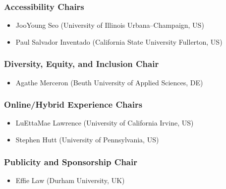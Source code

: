 \documentclass[letterpaper,11pt,oneside]{book} %
\providecommand{\tightlist}{%
  \setlength{\itemsep}{0pt}\setlength{\parskip}{0pt}}
\begin{document}
\subsubsection{Accessibility Chairs}%

\begin{itemize}
\tightlist
\item
  JooYoung Seo (University of Illinois Urbana--Champaign, US)
\item
  Paul Salvador Inventado (California State University Fullerton, US)
\end{itemize}

\subsubsection{Diversity, Equity, and Inclusion
Chair}%

\begin{itemize}
\tightlist
\item
  Agathe Merceron (Beuth University of Applied Sciences, DE)
\end{itemize}

\subsubsection{Online/Hybrid Experience
Chairs}%

\begin{itemize}
\tightlist
\item
  LuEttaMae Lawrence (University of California Irvine, US)
\item
  Stephen Hutt (University of Pennsylvania, US)
\end{itemize}

\subsubsection{Publicity and Sponsorship
Chair}%

\begin{itemize}
\tightlist
\item
  Effie Law (Durham University, UK)
\end{itemize}
\end{document}
